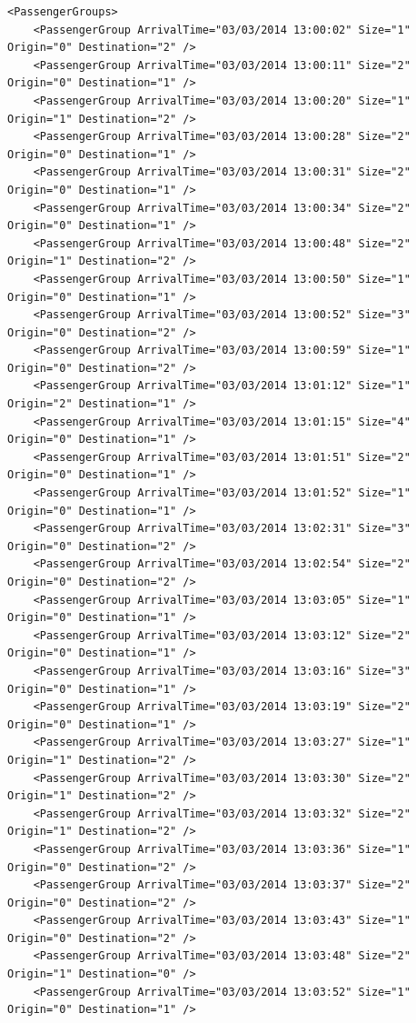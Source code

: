 \documentclass{UoYCSproject}
\begin{document}
\lstset{language=XML}
\begin{lstlisting}
<PassengerGroups>
	<PassengerGroup ArrivalTime="03/03/2014 13:00:02" Size="1" Origin="0" Destination="2" />
	<PassengerGroup ArrivalTime="03/03/2014 13:00:11" Size="2" Origin="0" Destination="1" />
	<PassengerGroup ArrivalTime="03/03/2014 13:00:20" Size="1" Origin="1" Destination="2" />
	<PassengerGroup ArrivalTime="03/03/2014 13:00:28" Size="2" Origin="0" Destination="1" />
	<PassengerGroup ArrivalTime="03/03/2014 13:00:31" Size="2" Origin="0" Destination="1" />
	<PassengerGroup ArrivalTime="03/03/2014 13:00:34" Size="2" Origin="0" Destination="1" />
	<PassengerGroup ArrivalTime="03/03/2014 13:00:48" Size="2" Origin="1" Destination="2" />
	<PassengerGroup ArrivalTime="03/03/2014 13:00:50" Size="1" Origin="0" Destination="1" />
	<PassengerGroup ArrivalTime="03/03/2014 13:00:52" Size="3" Origin="0" Destination="2" />
	<PassengerGroup ArrivalTime="03/03/2014 13:00:59" Size="1" Origin="0" Destination="2" />
	<PassengerGroup ArrivalTime="03/03/2014 13:01:12" Size="1" Origin="2" Destination="1" />
	<PassengerGroup ArrivalTime="03/03/2014 13:01:15" Size="4" Origin="0" Destination="1" />
	<PassengerGroup ArrivalTime="03/03/2014 13:01:51" Size="2" Origin="0" Destination="1" />
	<PassengerGroup ArrivalTime="03/03/2014 13:01:52" Size="1" Origin="0" Destination="1" />
	<PassengerGroup ArrivalTime="03/03/2014 13:02:31" Size="3" Origin="0" Destination="2" />
	<PassengerGroup ArrivalTime="03/03/2014 13:02:54" Size="2" Origin="0" Destination="2" />
	<PassengerGroup ArrivalTime="03/03/2014 13:03:05" Size="1" Origin="0" Destination="1" />
	<PassengerGroup ArrivalTime="03/03/2014 13:03:12" Size="2" Origin="0" Destination="1" />
	<PassengerGroup ArrivalTime="03/03/2014 13:03:16" Size="3" Origin="0" Destination="1" />
	<PassengerGroup ArrivalTime="03/03/2014 13:03:19" Size="2" Origin="0" Destination="1" />
	<PassengerGroup ArrivalTime="03/03/2014 13:03:27" Size="1" Origin="1" Destination="2" />
	<PassengerGroup ArrivalTime="03/03/2014 13:03:30" Size="2" Origin="1" Destination="2" />
	<PassengerGroup ArrivalTime="03/03/2014 13:03:32" Size="2" Origin="1" Destination="2" />
	<PassengerGroup ArrivalTime="03/03/2014 13:03:36" Size="1" Origin="0" Destination="2" />
	<PassengerGroup ArrivalTime="03/03/2014 13:03:37" Size="2" Origin="0" Destination="2" />
	<PassengerGroup ArrivalTime="03/03/2014 13:03:43" Size="1" Origin="0" Destination="2" />
	<PassengerGroup ArrivalTime="03/03/2014 13:03:48" Size="2" Origin="1" Destination="0" />
	<PassengerGroup ArrivalTime="03/03/2014 13:03:52" Size="1" Origin="0" Destination="1" />

\end{lstlisting}
\end{document}
